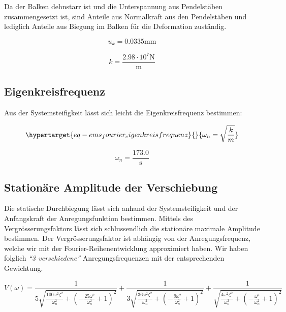 \documentclass[
  letterpaper,
  DIV=11]{scrreprt}
\begin{document}
Da der Balken dehnstarr ist und die Unterspannung aus Pendelstäben
zusammengesetzt ist, sind Anteile aus Normalkraft aus den Pendelstäben
und lediglich Anteile aus Biegung im Balken für die Deformation
zuständig.

\begin{equation}u_{k} = 0.0335 \text{mm}\end{equation}

\begin{equation}k = \frac{2.98 \cdot 10^{7} \text{N}}{\text{m}}\end{equation}

\hypertarget{eigenkreisfrequenz-6}{%
\subsection{Eigenkreisfrequenz}\label{eigenkreisfrequenz-6}}

Aus der Systemsteifigkeit lässt sich leicht die Eigenkreisfrequenz
bestimmen:

\begin{equation}\protect\hypertarget{eq-ems_fourier_eigenkreisfrequenz}{}{
\omega_n =\sqrt{\frac{k}{m}}
}\label{eq-ems_fourier_eigenkreisfrequenz}\end{equation}

\begin{equation}\omega_{n} = \frac{173.0}{\text{s}}\end{equation}

\hypertarget{stationuxe4re-amplitude-der-verschiebung}{%
\subsection{Stationäre Amplitude der
Verschiebung}\label{stationuxe4re-amplitude-der-verschiebung}}

Die statische Durchbiegung lässt sich anhand der Systemsteifigkeit und
der Anfangskraft der Anregungsfunktion bestimmen. Mittels des
Vergrösserungsfaktors lässt sich schlussendlich die stationäre maximale
Amplitude bestimmen. Der Vergrösserungsfaktor ist abhängig von der
Anregungsfrequenz, welche wir mit der Fourier-Reihenentwicklung
approximiert haben. Wir haben folglich \emph{``3 verschiedene''}
Anregungsfrequenzen mit der entsprechenden Gewichtung.

\begin{equation}V{\left(\omega \right)} = \frac{1}{5 \sqrt{\frac{100 \omega^{2} \zeta_{}^{2}}{\omega_{n}^{2}} + \left(- \frac{25 \omega^{2}}{\omega_{n}^{2}} + 1\right)^{2}}} + \frac{1}{3 \sqrt{\frac{36 \omega^{2} \zeta_{}^{2}}{\omega_{n}^{2}} + \left(- \frac{9 \omega^{2}}{\omega_{n}^{2}} + 1\right)^{2}}} + \frac{1}{\sqrt{\frac{4 \omega^{2} \zeta_{}^{2}}{\omega_{n}^{2}} + \left(- \frac{\omega^{2}}{\omega_{n}^{2}} + 1\right)^{2}}}\end{equation}
\end{document}
